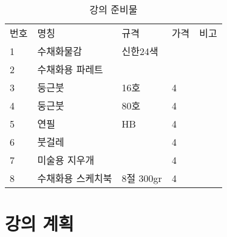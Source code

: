 \documentclass[12pt, a4paper, oneside]{book}
\let\stdsection\section
\renewcommand\section{\newpage\stdsection}
\begin{document}
		\begin{table}[hbp]
		\caption{ 강의 준비물 }
		\centering 

		\tabulinesep=6pt

		\begin{tabu} to \linewidth{ X[r,1] X[r,4] X[c,3] X[c,2]  X[c,2] }
			\toprule
			번호		&명칭	&규격	&가격	 	&비고	 \\
			\tabucline[1pt]{-}
			1 	&수채화물감			&신한24색	&	 \\ \tabucline[1pt]{=}
			2 	&수채화용 파레트		&			&	 \\ \tabucline[1pt]{=}
			3 	&둥근붓 				&16호		&4	 \\ \tabucline[1pt]{=}
			4 	&둥근붓 				&80호		&4	 \\ \tabucline[1pt]{=}
			5 	&연필 				&HB			&4	 \\ \tabucline[1pt]{=}
			6 	&붓걸레 				&			&4	 \\ \tabucline[1pt]{=}
			7 	&미술용 지우개		&			&4	 \\ \tabucline[1pt]{=}
			8 	&수채화용 스케치북	&8절 300gr	&4	 \\
			\bottomrule
		\end{tabu}

		\end{table}



%
	\section{ 강의 계획 }



\end{document}
